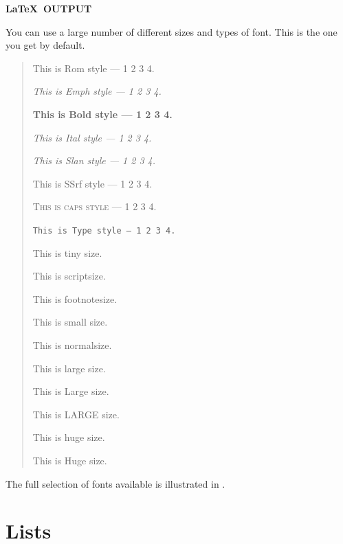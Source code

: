 \documentclass[twoside,11pt]{starlink}
\begin{document}
\begin{center}
\textbf{\LaTeX\ OUTPUT}
\end{center}

You can use a large number of different sizes and types of font.
This is the one you get by default.

\vspace{10mm}

\begin{quote}

\textrm{This is Rom style --- 1 2 3 4.}

\emph{This is Emph style --- 1 2 3 4.}

\textbf{This is Bold style --- 1 2 3 4.}

\textit{This is Ital style --- 1 2 3 4.}

\textsl{This is Slan style --- 1 2 3 4.}

\textsf{This is SSrf style --- 1 2 3 4.}

\textsc{This is caps style --- 1 2 3 4.}

\texttt{This is Type style --- 1 2 3 4.}

{\tiny This is tiny size.}

{\scriptsize This is scriptsize.}

{\footnotesize This is footnotesize.}

{\small This is small size.}

{\normalsize This is normalsize.}

{\large This is large size.}

{\Large This is Large size.}

{\LARGE This is LARGE size.}

{\huge This is huge size.}

{\Huge This is Huge size.}

\end{quote}

\vspace{10mm}

The full selection of fonts available is illustrated in .

\newpage

\section{Lists}
\end{document}
